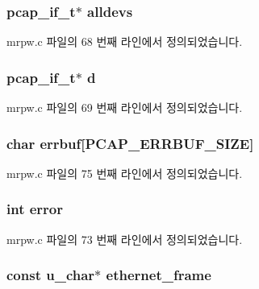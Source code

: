 \subsubsection[{\texorpdfstring{alldevs}{alldevs}}]{\setlength{\rightskip}{0pt plus 5cm}pcap\+\_\+if\+\_\+t$\ast$ alldevs}\hypertarget{structnetif_a2be2f5d8859972dbfd0a842bf7946e61}{}\label{structnetif_a2be2f5d8859972dbfd0a842bf7946e61}


mrpw.\+c 파일의 68 번째 라인에서 정의되었습니다.

\subsubsection[{\texorpdfstring{d}{d}}]{\setlength{\rightskip}{0pt plus 5cm}pcap\+\_\+if\+\_\+t$\ast$ d}\hypertarget{structnetif_a6613c16cd9a1fcb4703a820d46c3789f}{}\label{structnetif_a6613c16cd9a1fcb4703a820d46c3789f}


mrpw.\+c 파일의 69 번째 라인에서 정의되었습니다.

\subsubsection[{\texorpdfstring{errbuf}{errbuf}}]{\setlength{\rightskip}{0pt plus 5cm}char errbuf\mbox{[}P\+C\+A\+P\+\_\+\+E\+R\+R\+B\+U\+F\+\_\+\+S\+I\+ZE\mbox{]}}\hypertarget{structnetif_a41891cad090df07cd9360f1d8a9f1396}{}\label{structnetif_a41891cad090df07cd9360f1d8a9f1396}


mrpw.\+c 파일의 75 번째 라인에서 정의되었습니다.

\subsubsection[{\texorpdfstring{error}{error}}]{\setlength{\rightskip}{0pt plus 5cm}int error}\hypertarget{structnetif_a11614f44ef4d939bdd984953346a7572}{}\label{structnetif_a11614f44ef4d939bdd984953346a7572}


mrpw.\+c 파일의 73 번째 라인에서 정의되었습니다.

\subsubsection[{\texorpdfstring{ethernet\+\_\+frame}{ethernet_frame}}]{\setlength{\rightskip}{0pt plus 5cm}const u\+\_\+char$\ast$ ethernet\+\_\+frame}\hypertarget{structnetif_a1e5f1fe400fe4123f31b8f5a72abdc99}{}\label{structnetif_a1e5f1fe400fe4123f31b8f5a72abdc99}


